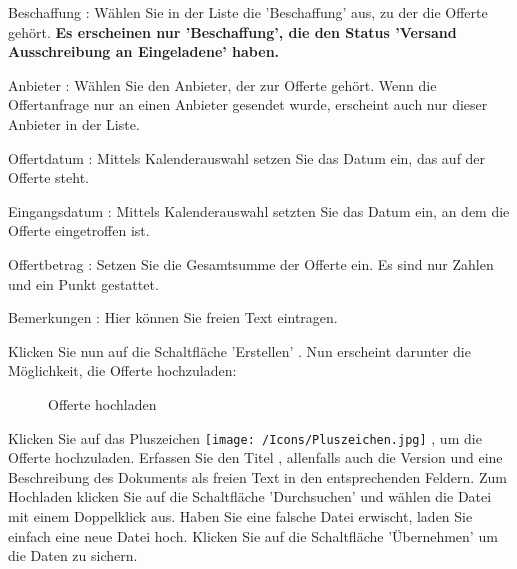 \vspace{\baselineskip}

\begin{compactitem}
\item
Beschaffung : Wählen Sie in der Liste die 'Beschaffung' aus, zu der die Offerte gehört. \textbf{Es erscheinen nur 'Beschaffung', die den Status 'Versand Ausschreibung an Eingeladene' haben.}
\item
Anbieter : Wählen Sie den Anbieter, der zur Offerte gehört. Wenn die Offertanfrage nur an einen Anbieter gesendet wurde, erscheint auch nur dieser Anbieter in der Liste.
\item
Offertdatum : Mittels Kalenderauswahl setzen Sie das Datum ein, das auf der Offerte steht.
\item
Eingangsdatum : Mittels Kalenderauswahl setzten Sie das Datum ein, an dem die Offerte eingetroffen ist.
\item
Offertbetrag : Setzen Sie die Gesamtsumme der Offerte ein. Es sind nur Zahlen und ein Punkt gestattet.
\item
Bemerkungen : Hier können Sie freien Text eintragen.
\end{compactitem}

\vspace{\baselineskip}

Klicken Sie nun auf die Schaltfläche 'Erstellen' . Nun erscheint darunter die Möglichkeit, die Offerte
hochzuladen:

\begin{figure}[H]
\caption{Offerte hochladen}
\end{figure}

Klicken Sie auf das Pluszeichen \texttt{[image: /Icons/Pluszeichen.jpg]} , um die Offerte hochzuladen. Erfassen Sie den Titel , allenfalls auch die Version  und eine Beschreibung  des Dokuments als freien Text in den entsprechenden Feldern. Zum Hochladen klicken Sie auf die Schaltfläche 'Durchsuchen'  und wählen die Datei mit einem Doppelklick aus. Haben Sie eine falsche Datei erwischt, laden Sie einfach eine neue Datei hoch. Klicken Sie auf die Schaltfläche 'Übernehmen'  um die Daten zu sichern.

